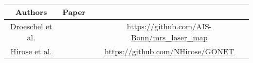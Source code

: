 \begin{tabular}{ccc}
	Authors & Paper & \acronym{url}\\ 
	\hline\hline
	Droeschel et al. & \cite{Droeschel} & \url{https://github.com/AIS-Bonn/mrs_laser_map}\\
	Hirose et al. & \cite{} & \url{https://github.com/NHirose/GONET}\\
\end{tabular}